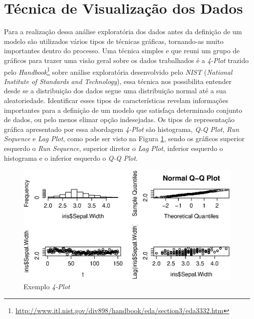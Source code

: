\section{Técnica de Visualização dos Dados}\label{4-plot}

Para a realização dessa análise exploratória dos dados antes da definição de um
modelo são utilizados vários tipos de técnicas gráficas, tornando-as muito
importantes dentro do processo. Uma técnica simples e que reuni um grupo de
gráficos para trazer uma visão geral sobre os dados trabalhados é a
\textit{4-Plot} trazido pelo
\textit{Handbook}\footnote{\url{http://www.itl.nist.gov/div898/handbook/eda/section3/eda3332.htm}}
sobre análise exploratória desenvolvido pelo \textit{NIST} (\textit{National
Institute of Standards and Technology}), essa técnica nos possibilita entender
desde se a distribuição dos dados segue uma distribuição normal até a sua
aleatoriedade. Identificar esses tipos de características revelam informações
importantes para a definição de um modelo que satisfaça determinado conjunto de
dados, ou pelo menos elimar opção indesejadas. Os tipos de representação gráfica
apresentado por essa abordagem \textit{4-Plot} são histograma, \textit{Q-Q
Plot}, \textit{Run Sequence} e \textit{Lag Plot}, como pode ser visto na Figura
\ref{fig:4-plot}, sendo os gráficos superior esquerdo o \textit{Run Sequence},
superior diretor o \textit{Lag Plot}, inferior esquerdo o histograma e o
inferior esquerdo o \textit{Q-Q Plot}.

\begin{figure}[h]
  \centering
  \includegraphics[width=1.0\textwidth]
      {figuras/4-plot}
      \caption{Exemplo \textit{4-Plot}}
  \label{fig:4-plot}
\end{figure}

